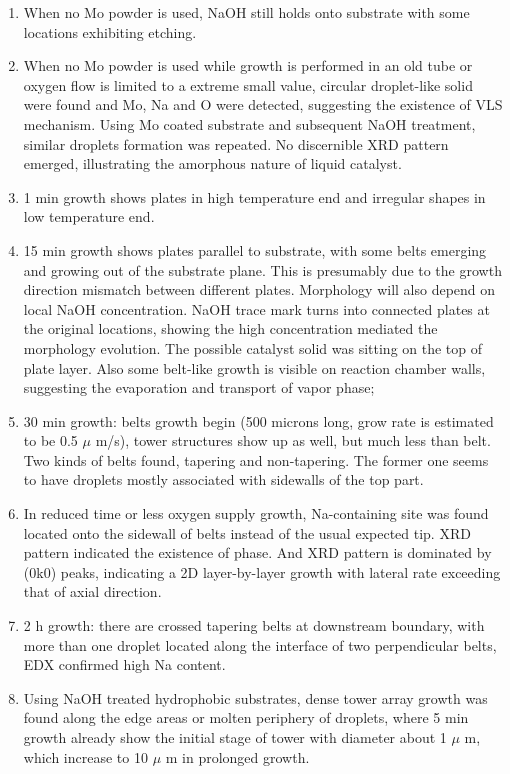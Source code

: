 \begin{enumerate}
\item When no Mo powder is used, NaOH still holds onto substrate with some locations exhibiting etching.
\item When no Mo powder is used while growth is performed in an old tube or oxygen flow is limited to a extreme small value, circular droplet-like solid were found and Mo, Na and O were detected, suggesting the existence of VLS mechanism. Using Mo coated substrate and subsequent NaOH treatment, similar droplets formation was repeated. No discernible XRD pattern emerged, illustrating the amorphous nature of liquid catalyst.
\item 1 min growth shows plates in high temperature end and irregular shapes in low temperature end.
\item 15 min growth shows  plates parallel to substrate, with some belts emerging and growing out of the substrate plane. This is presumably due to the growth direction mismatch between different plates. Morphology will also depend on local NaOH concentration. NaOH trace mark turns into connected plates at the original locations, showing the high concentration mediated the morphology evolution. The possible catalyst solid was sitting on the top of plate layer. Also some belt-like growth is visible on reaction chamber walls, suggesting the evaporation and transport of  vapor phase;
\item 30 min growth: belts growth begin (500 microns long, grow rate is estimated to be 0.5 $\mu$ m/s), tower structures show up as well, but much less than belt. Two kinds of belts found, tapering and non-tapering. The former one seems to have droplets mostly associated with sidewalls of the top part.
\item In reduced time or less oxygen supply growth, Na-containing site was found located onto the sidewall of belts instead of the usual expected tip. XRD pattern indicated the existence of  phase. And  XRD pattern is dominated by (0k0) peaks, indicating a 2D layer-by-layer growth with lateral rate exceeding that of axial direction.
\item 2 h growth: there are crossed tapering belts at downstream boundary, with more than one droplet located along the interface of two perpendicular belts, EDX confirmed high Na content.
\item Using NaOH treated hydrophobic substrates, dense tower array growth was found along the edge areas or molten periphery of droplets, where 5 min growth already show the initial stage of tower with diameter about 1 $\mu$ m, which increase to 10 $\mu$ m in prolonged growth.
\end{enumerate}

